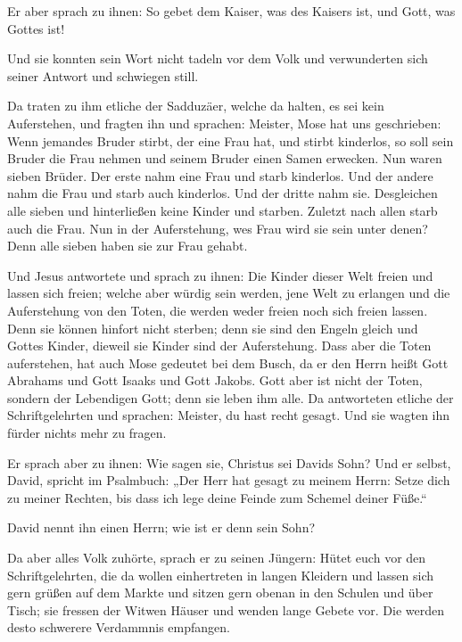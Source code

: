  Er aber sprach zu ihnen: So gebet dem Kaiser, was des
Kaisers ist, und Gott, was Gottes ist!

 Und sie konnten sein Wort nicht tadeln vor dem Volk und
verwunderten sich seiner Antwort und schwiegen still.

 Da traten zu ihm etliche der Sadduzäer, welche da
halten, es sei kein Auferstehen, und fragten ihn  und
sprachen: Meister, Mose hat uns geschrieben: Wenn jemandes Bruder
stirbt, der eine Frau hat, und stirbt kinderlos, so soll sein Bruder die
Frau nehmen und seinem Bruder einen Samen erwecken.  Nun
waren sieben Brüder. Der erste nahm eine Frau und starb kinderlos.
 Und der andere nahm die Frau und starb auch kinderlos.
 Und der dritte nahm sie. Desgleichen alle sieben und
hinterließen keine Kinder und starben.  Zuletzt nach
allen starb auch die Frau.  Nun in der Auferstehung, wes
Frau wird sie sein unter denen? Denn alle sieben haben sie zur Frau
gehabt.

 Und Jesus antwortete und sprach zu ihnen: Die Kinder
dieser Welt freien und lassen sich freien;  welche aber
würdig sein werden, jene Welt zu erlangen und die Auferstehung von den
Toten, die werden weder freien noch sich freien lassen. 
Denn sie können hinfort nicht sterben; denn sie sind den Engeln gleich
und Gottes Kinder, dieweil sie Kinder sind der Auferstehung.
 Dass aber die Toten auferstehen, hat auch Mose gedeutet
bei dem Busch, da er den Herrn heißt Gott Abrahams und Gott Isaaks und
Gott Jakobs.  Gott aber ist nicht der Toten, sondern der
Lebendigen Gott; denn sie leben ihm alle.  Da antworteten
etliche der Schriftgelehrten und sprachen: Meister, du hast recht
gesagt.  Und sie wagten ihn fürder nichts mehr zu fragen.

 Er sprach aber zu ihnen: Wie sagen sie, Christus sei
Davids Sohn?  Und er selbst, David, spricht im Psalmbuch:
„Der Herr hat gesagt zu meinem Herrn: Setze dich zu meiner Rechten,
 bis dass ich lege deine Feinde zum Schemel deiner
Füße.``

 David nennt ihn einen Herrn; wie ist er denn sein Sohn?

 Da aber alles Volk zuhörte, sprach er zu seinen Jüngern:
 Hütet euch vor den Schriftgelehrten, die da wollen
einhertreten in langen Kleidern und lassen sich gern grüßen auf dem
Markte und sitzen gern obenan in den Schulen und über Tisch;
 sie fressen der Witwen Häuser und wenden lange Gebete
vor. Die werden desto schwerere Verdammnis empfangen.


